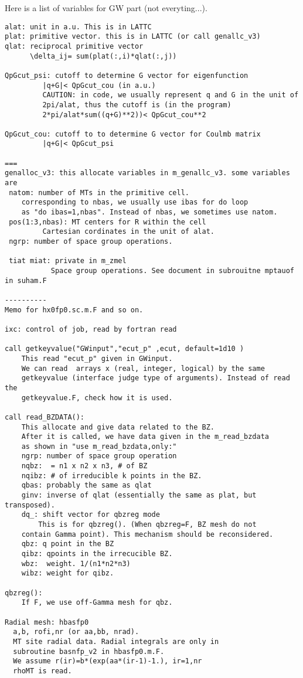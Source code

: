 \documentclass[a4paper,10pt,fleqn]{article}
\begin{document}
Here is a list of variables for GW part (not everyting...). 
\begin{verbatim}
alat: unit in a.u. This is in LATTC 
plat: primitive vector. this is in LATTC (or call genallc_v3)
qlat: reciprocal primitive vector  
      \delta_ij= sum(plat(:,i)*qlat(:,j))

QpGcut_psi: cutoff to determine G vector for eigenfunction
         |q+G|< QpGcut_cou (in a.u.)
         CAUTION: in code, we usually represent q and G in the unit of
         2pi/alat, thus the cutoff is (in the program)
         2*pi/alat*sum((q+G)**2))< QpGcut_cou**2
         
QpGcut_cou: cutoff to to determine G vector for Coulmb matrix
         |q+G|< QpGcut_psi

=== 
genalloc_v3: this allocate variables in m_genallc_v3. some variables are
 natom: number of MTs in the primitive cell.
    corresponding to nbas, we usually use ibas for do loop
    as "do ibas=1,nbas". Instead of nbas, we sometimes use natom.
 pos(1:3,nbas): MT centers for R within the cell
         Cartesian cordinates in the unit of alat.
 ngrp: number of space group operations. 

 tiat miat: private in m_zmel
           Space group operations. See document in subrouitne mptauof in suham.F

----------
Memo for hx0fp0.sc.m.F and so on.

ixc: control of job, read by fortran read

call getkeyvalue("GWinput","ecut_p" ,ecut, default=1d10 )
    This read "ecut_p" given in GWinput. 
    We can read  arrays x (real, integer, logical) by the same
    getkeyvalue (interface judge type of arguments). Instead of read the
    getkeyvalue.F, check how it is used.

call read_BZDATA():
    This allocate and give data related to the BZ. 
    After it is called, we have data given in the m_read_bzdata
    as shown in "use m_read_bzdata,only:"
    ngrp: number of space group operation
    nqbz:  = n1 x n2 x n3, # of BZ 
    nqibz: # of irreducible k points in the BZ.
    qbas: probably the same as qlat
    ginv: inverse of qlat (essentially the same as plat, but transposed).
    dq_: shift vector for qbzreg mode
        This is for qbzreg(). (When qbzreg=F, BZ mesh do not
	contain Gamma point). This mechanism should be reconsidered.
    qbz: q point in the BZ
    qibz: qpoints in the irrecucible BZ.
    wbz:  weight. 1/(n1*n2*n3)
    wibz: weight for qibz.

qbzreg():
    If F, we use off-Gamma mesh for qbz.

Radial mesh: hbasfp0
  a,b, rofi,nr (or aa,bb, nrad).
  MT site radial data. Radial integrals are only in 
  subroutine basnfp_v2 in hbasfp0.m.F.
  We assume r(ir)=b*(exp(aa*(ir-1)-1.), ir=1,nr
  rhoMT is read.
\end{verbatim}
\end{document}
